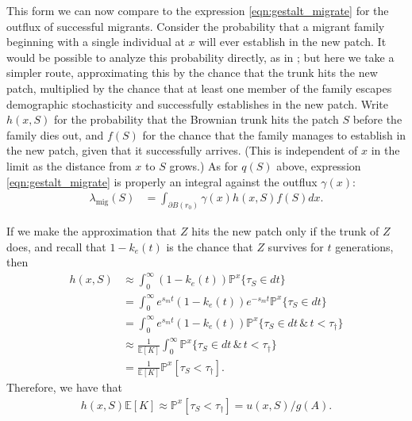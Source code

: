 \documentclass{article}
\newcommand{\citet}[1]{\cite{#1}}
\renewcommand{\P}{\mathbb{P}}
\newcommand{\E}{\mathbb{E}}
\newcommand{\migrate}{\lambda_\text{mig}}
\begin{document}
This form we can now compare to 
the expression \eqref{eqn:gestalt_migrate} for the outflux of successful migrants.
Consider the probability that a migrant family beginning with a single individual at $x$ will ever establish in the new patch.
It would be possible to analyze this probability directly,
as in \citet{barton1987establishment};
but here we take a simpler route, 
approximating this by the chance that the trunk hits the new patch,
multiplied by the chance that at least one member of the family escapes demographic stochasticity
and successfully establishes in the new patch.
Write $h(x,S)$ for the probability that the Brownian trunk hits the patch $S$
before the family dies out,
and $f(S)$ for the chance that the family manages to establish in the new patch,
given that it successfully arrives.
(This is independent of $x$ in the limit as the distance from $x$ to $S$ grows.)
As for $q(S)$ above, expression \eqref{eqn:gestalt_migrate} is properly an integral against the outflux $\gamma(x)$:
\begin{align}\label{eqn:migrate_integral}
  \migrate(S) &= \int_{\partial B(r_0)} \gamma(x) h(x,S) f(S) dx .
\end{align}


If we make the approximation that $Z$ hits the new patch only if the trunk of $Z$ does,
and recall that $1-k_e(t)$ is the chance that $Z$ survives for $t$ generations,
then 
\begin{align}
    h(x,S) &\approx \int_0^\infty (1-k_e(t)) \P^x\{ \tau_S \in dt \} \\
           &= \int_0^\infty e^{s_m t} (1-k_e(t)) e^{- s_m t } \P^x\{ \tau_S \in dt \} \\
           &=\int_0^\infty e^{s_m t} (1-k_e(t)) \P^x\{ \tau_S \in dt \, \& \, t < \tau_\dagger \} \\
           &\approx \frac{1}{\E[K]} \int_0^\infty \P^x\{ \tau_S \in dt \, \& \, t < \tau_\dagger \} \\
    &= \frac{1}{\E[K]} \P^x[ \tau_S < \tau_\dagger ] .
\end{align}
Therefore, we have that
\begin{align} \label{eqn:boils_downto}
    h(x,S) \E[K] 
    \approx \P^x[ \tau_S < \tau_\dagger ] 
    = u(x,S) / g(A) .
\end{align}
\end{document}
